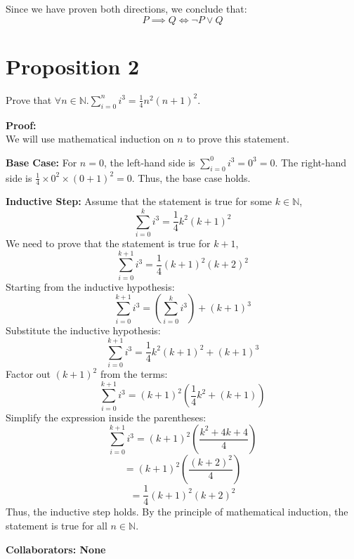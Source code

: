 \documentclass[12 pt]{article}
\begin{document}
Since we have proven both directions, we conclude that:
\[
P \implies Q \iff \neg P \lor Q
\]
\vspace{20pt}

\section*{Proposition 2}							
Prove that \(\forall n \in \mathbb{N}. \sum_{i=0}^{n} i^3 = \frac{1}{4} n^2 (n+1)^2\).

\noindent\textbf{Proof:} \\[10pt]              
We will use mathematical induction on $n$ to prove this statement.

\noindent\textbf{Base Case:}
For \(n = 0\), the left-hand side is \(\sum_{i=0}^{0} i^3 = 0^3 = 0\).  
The right-hand side is \(\frac{1}{4} \times 0^2 \times (0+1)^2 = 0\).  
Thus, the base case holds.

\vspace{10pt}

\noindent\textbf{Inductive Step:}
Assume that the statement is true for some \(k \in \mathbb{N}\),
\[
\sum_{i=0}^{k} i^3 = \frac{1}{4} k^2 (k+1)^2
\]
We need to prove that the statement is true for \(k+1\),
\[
\sum_{i=0}^{k+1} i^3 = \frac{1}{4} (k+1)^2 (k+2)^2
\]
Starting from the inductive hypothesis:
\[
\sum_{i=0}^{k+1} i^3 = \left(\sum_{i=0}^{k} i^3\right) + (k+1)^3
\]
Substitute the inductive hypothesis:
\[
\sum_{i=0}^{k+1} i^3 = \frac{1}{4} k^2 (k+1)^2 + (k+1)^3
\]
Factor out \((k+1)^2\) from the terms:
\[
\sum_{i=0}^{k+1} i^3 = (k+1)^2 \left(\frac{1}{4} k^2 + (k+1)\right)
\]
Simplify the expression inside the parentheses:
\[
\sum_{i=0}^{k+1} i^3 = (k+1)^2 \left(\frac{k^2 + 4k + 4}{4}\right) 
\]
\[
= (k+1)^2 \left(\frac{(k+2)^2}{4}\right)
\]
\[
= \frac{1}{4} (k+1)^2 (k+2)^2
\]
Thus, the inductive step holds. By the principle of mathematical induction, the statement is true for all \(n \in \mathbb{N}\).

\vspace{20pt}
\noindent\textbf{Collaborators: None}
\end{document}
